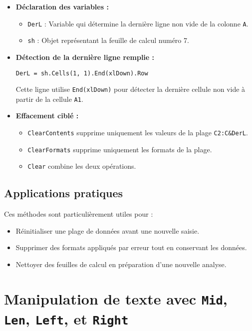 \documentclass[a4paper,12pt]{report}
\begin{document}
\begin{itemize}
	\item \textbf{Déclaration des variables :}
	\begin{itemize}
		\item \texttt{DerL} : Variable qui détermine la dernière ligne non vide de la colonne \texttt{A}.
		\item \texttt{sh} : Objet représentant la feuille de calcul numéro 7.
	\end{itemize}
	\item \textbf{Détection de la dernière ligne remplie :}
	\begin{lstlisting}[language=vbscript]
		DerL = sh.Cells(1, 1).End(xlDown).Row
	\end{lstlisting}
	Cette ligne utilise \texttt{End(xlDown)} pour détecter la dernière cellule non vide à partir de la cellule \texttt{A1}.
	\item \textbf{Effacement ciblé :}
	\begin{itemize}
		\item \texttt{ClearContents} supprime uniquement les valeurs de la plage \texttt{C2:C\&DerL}.
		\item \texttt{ClearFormats} supprime uniquement les formats de la plage.
		\item \texttt{Clear} combine les deux opérations.
	\end{itemize}
\end{itemize}

\section{Applications pratiques}

Ces méthodes sont particulièrement utiles pour :
\begin{itemize}
	\item Réinitialiser une plage de données avant une nouvelle saisie.
	\item Supprimer des formats appliqués par erreur tout en conservant les données.
	\item Nettoyer des feuilles de calcul en préparation d'une nouvelle analyse.
\end{itemize}

\chapter{Manipulation de texte avec \texttt{Mid}, \texttt{Len}, \texttt{Left}, et \texttt{Right}}
\end{document}
